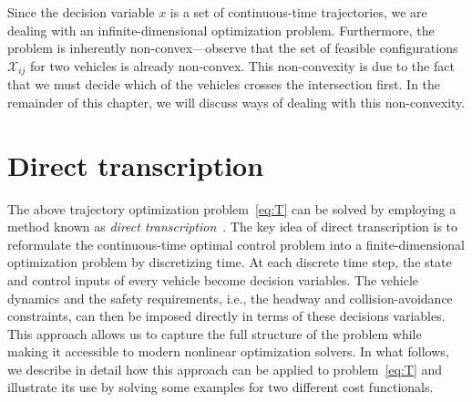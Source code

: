 \documentclass{report}
\theoremstyle{definition}
\theoremstyle{plain}
\begin{document}
Since the decision variable $x$ is a set of continuous-time trajectories, we are
dealing with an infinite-dimensional optimization problem. Furthermore, the
problem is inherently non-convex---observe that the set of feasible
configurations $\mathcal{X}_{ij}$ for two vehicles is already non-convex.
%
This non-convexity is due to the fact that we must decide which of the vehicles
crosses the intersection first. In the remainder of this chapter, we will
discuss ways of dealing with this non-convexity.


\section{Direct transcription}\label{sec:direct-transcription}

The above trajectory optimization problem~\eqref{eq:T} can be solved by
employing a method known as \emph{direct
  transcription}~\cite{kellyIntroductionTrajectoryOptimization2017,TrajectoryOptimization}.
%
The key idea of direct transcription is to reformulate the continuous-time
optimal control problem into a finite-dimensional optimization problem by
discretizing time.
%
At each discrete time step, the state and control inputs of every vehicle become
decision variables. The vehicle dynamics and the safety requirements, i.e., the
headway and collision-avoidance constraints, can then be imposed directly in
terms of these decisions variables.
%
This approach allows us to capture the full structure of the problem while
making it accessible to modern nonlinear optimization solvers.
%
In what follows, we describe in detail how this approach can be applied to
problem~\eqref{eq:T} and illustrate its use by solving some examples for two different
cost functionals.
\end{document}

